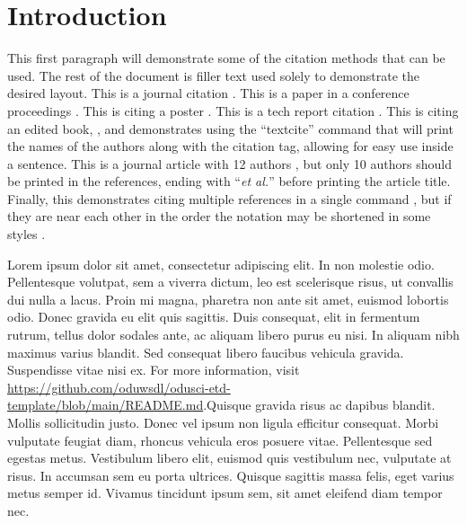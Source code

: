 \chapter{Introduction} 
This first paragraph will demonstrate some of the citation methods that can be used. The rest of the document is filler text used solely to demonstrate the desired layout.  This is a journal citation \autocite{berlin-tweb23}. This is a paper in a conference proceedings \autocite{weigle-jcdl23}. This is citing a poster \autocite{jayanetti-sbp23}. This is a tech report citation \autocite{weigle-2023}. This is citing an edited book, \textcite{vanet-book}, and demonstrates using the ``textcite'' command that will print the names of the authors along with the citation tag, allowing for easy use inside a sentence.  This is a journal article with 12 authors \autocite{coifman2005geometric}, but only 10 authors should be printed in the references, ending with ``\emph{et al.}'' before printing the article title.  Finally, this  demonstrates citing multiple references in a single command \autocites{jones-memento21,vanet-book,weigle-jcdl23}, but if they are near each other in the order the notation may be shortened in some styles \autocites{berlin-tweb23, weigle-jcdl23, jayanetti-sbp23}.

Lorem ipsum dolor sit amet, consectetur adipiscing elit. In non molestie odio. Pellentesque volutpat, sem a viverra dictum, leo est scelerisque risus, ut convallis dui nulla a lacus. Proin mi magna, pharetra non ante sit amet, euismod lobortis odio. Donec gravida eu elit quis sagittis. Duis consequat, elit in fermentum rutrum, tellus dolor sodales ante, ac aliquam libero purus eu nisi. In aliquam nibh maximus varius blandit. Sed consequat libero faucibus vehicula gravida. Suspendisse vitae nisi ex. For more information, visit \url{https://github.com/oduwsdl/odusci-etd-template/blob/main/README.md}.Quisque gravida risus ac dapibus blandit. Mollis sollicitudin justo. Donec vel ipsum non ligula efficitur consequat. Morbi vulputate feugiat diam, rhoncus vehicula eros posuere vitae. Pellentesque sed egestas metus. Vestibulum libero elit, euismod quis vestibulum nec, vulputate at risus. In accumsan sem eu porta ultrices. Quisque sagittis massa felis, eget varius metus semper id. Vivamus tincidunt ipsum sem, sit amet eleifend diam tempor nec.


